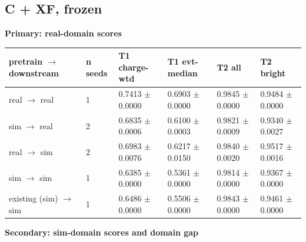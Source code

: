 \documentclass[10pt,a4paper]{article}
\begin{document}
\subsection{C + XF, frozen}
\textbf{Primary: real-domain scores}

\begin{center}\footnotesize
\setlength{\tabcolsep}{3pt}\renewcommand{\arraystretch}{1.15}
\begin{tabularx}{\linewidth}{LLLLLL}
\toprule
\textbf{pretrain $\rightarrow$ downstream} & \textbf{n seeds} & \textbf{T1 charge-wtd} & \textbf{T1 evt-median} & \textbf{T2 all} & \textbf{T2 bright} \\
\midrule
real $\rightarrow$ real & 1 & 0.7413 $\pm$ 0.0000 & 0.6903 $\pm$ 0.0000 & 0.9845 $\pm$ 0.0000 & 0.9484 $\pm$ 0.0000 \\
sim $\rightarrow$ real & 2 & 0.6835 $\pm$ 0.0006 & 0.6100 $\pm$ 0.0003 & 0.9821 $\pm$ 0.0009 & 0.9340 $\pm$ 0.0027 \\
real $\rightarrow$ sim & 2 & 0.6983 $\pm$ 0.0076 & 0.6217 $\pm$ 0.0150 & 0.9840 $\pm$ 0.0020 & 0.9517 $\pm$ 0.0016 \\
sim $\rightarrow$ sim & 1 & 0.6385 $\pm$ 0.0000 & 0.5361 $\pm$ 0.0000 & 0.9814 $\pm$ 0.0000 & 0.9367 $\pm$ 0.0000 \\
existing (sim) $\rightarrow$ sim & 1 & 0.6486 $\pm$ 0.0000 & 0.5506 $\pm$ 0.0000 & 0.9843 $\pm$ 0.0000 & 0.9461 $\pm$ 0.0000 \\
\bottomrule
\end{tabularx}
\end{center}
\textbf{Secondary: sim-domain scores and domain gap}
\end{document}
